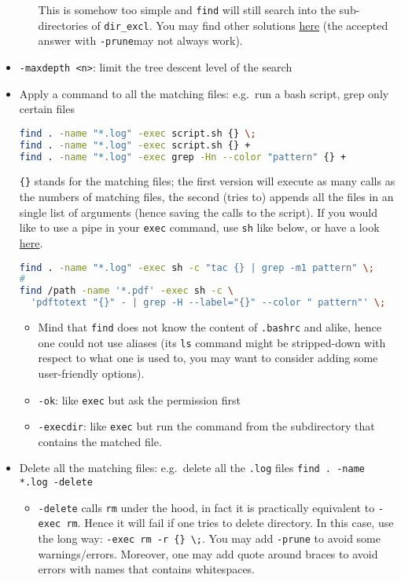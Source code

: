 \documentclass[a4paper,12pt,%
              final%
              ]{article}
\begin{document}
\begin{itemize}
\begin{itemize}
\begin{lstlisting}[language=bash]
\end{lstlisting}
        This is somehow too simple and \texttt{find} will still search into the sub-directories of \verb|dir_excl|. You may find other solutions \href{https://stackoverflow.com/questions/4210042/how-to-exclude-a-directory-in-find-command}{here} (the accepted answer with \verb|-prune|may not always work).
    \end{itemize}
  \item \verb|-maxdepth <n>|: limit the tree descent level of the search
  \item Apply a command to all the matching files: e.g.\ run a bash script, grep only certain files
\begin{lstlisting}[language=bash]
find . -name "*.log" -exec script.sh {} \;
find . -name "*.log" -exec script.sh {} +
find . -name "*.log" -exec grep -Hn --color "pattern" {} +
\end{lstlisting}
    \verb|{}| stands for the matching files; the first version will execute as many calls as the numbers of matching files, the second (tries to) appends all the files in an single list of arguments (hence saving the calls to the script). If you would like to use a pipe in your \texttt{exec} command, use \texttt{sh} like below, or have a look \href{https://stackoverflow.com/questions/307015/how-do-i-include-a-pipe-in-my-linux-find-exec-command}{here}.
\begin{lstlisting}[language=bash]
find . -name "*.log" -exec sh -c "tac {} | grep -m1 pattern" \;
#
find /path -name '*.pdf' -exec sh -c \
  'pdftotext "{}" - | grep -H --label="{}" --color " pattern"' \;
\end{lstlisting}
  \begin{itemize}
    \item Mind that \texttt{find} does not know the content of \texttt{.bashrc} and alike, hence one could not use aliases (its \texttt{ls} command might be stripped-down with respect to what one is used to, you may want to consider adding some user-friendly options).
  \end{itemize}
  \begin{itemize}
    \item \verb|-ok|: like \texttt{exec} but ask the permission first
    \item \verb|-execdir|: like \texttt{exec} but run the command from the subdirectory that contains the matched file.
  \end{itemize}
  \item Delete all the matching files: e.g.\ delete all the \texttt{.log} files \texttt{find . -name *.log -delete}
    \begin{itemize}
      \item \texttt{-delete} calls \texttt{rm} under the hood, in fact it is practically equivalent to \texttt{-exec rm}. Hence it will fail if one tries to delete directory. In this case, use the long way: \verb|-exec rm -r {} \;|. You may add \verb|-prune| to avoid some warnings/errors. Moreover, one may add quote around braces to avoid errors with names that contains whitespaces.
    \end{itemize}
\end{itemize}
\end{document}
